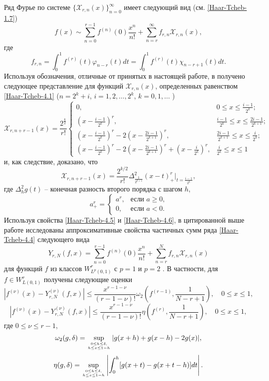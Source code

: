 Ряд Фурье по системе $\{\mathcal{X}_{r,n}(x)\}_{n=0}^\infty$ имеет следующий вид (см. \eqref{Haar-Tcheb-1.7})
  \begin{equation}\label{Haar-Tcheb-4.4}
f(x)\sim \sum_{n=0}^{r-1} f^{(n)}(0)\frac{x^n}{n!}+ \sum_{n=r}^\infty f_{r,n}\mathcal{X}_{r,n}(x),
\end{equation}
где
  $$
 f_{r,n}=\int_0^1 f^{(r)}(t)\varphi_{n-r}(t)dt=\int_0^1 f^{(r)}(t) \chi_{n-r+1}(t)dt.
$$
Используя обозначения, отличные от принятых в настоящей работе, в \cite{Haar-Tcheb-Shar19}  получено  следующее представление для функций $\mathcal{X}_{r,n}(x)$, определенных равенством \eqref{Haar-Tcheb-4.1}
 ($n=2^k+i$, $i=1,2,\ldots,2^k $, $k=0,1,\ldots$ )
  \begin{equation}\label{Haar-Tcheb-4.5}
 \mathcal{X}_{r,n+r-1}(x)=\frac{2^{\frac{k}{2}}}{r!}
 \begin{cases} 0,&\text{$0\le x\le\frac{i-1}{2^k}$;}\\
 (x-\frac{i-1}{2^k})^r,&\text{$\frac{i-1}{2^k}\le x\le \frac{2i-1}{2^{k+1}}$;}\\
 (x-\frac{i-1}{2^k})^r-2(x-\frac{2i-1}{2^{k+1}})^r,&\text{$\frac{2i-1}{2^{k+1}}\le x\le \frac{i}{2^{k}}$;}\\
  (x-\frac{i-1}{2^k})^r-2(x-\frac{2i-1}{2^{k+1}})^r+(x-\frac{i}{2^{k}})^r, &\text{$\frac{i}{2^{k}}\le x\le1$}
   \end{cases}
  \end{equation}
 и, как следствие, доказано, что
   \begin{equation}\label{Haar-Tcheb-4.6}
 \mathcal{X}_{r,n+r-1}(x)=\frac{2^{k/2}}{r!}\Delta^2_\frac{1}{2^{k+1}}(x-t)^r_+
 \big|_{t=\frac{i-1}{2^k}},
\end{equation}
где $\Delta^2_h g(t)$ -- конечная разность второго порядка с шагом $h$,
$$
a_+^r=\begin{cases}a^r,&\text{если $a\ge0$,}\\0, &\text{если $a<0$.}   \end{cases}
$$
Используя свойства \eqref{Haar-Tcheb-4.5} и \eqref{Haar-Tcheb-4.6}, в цитированной выше работе  \cite{Haar-Tcheb-Shar19} исследованы аппроксимативные свойства частичных сумм  ряда \eqref{Haar-Tcheb-4.4} следующего вида
\begin{equation}\label{Haar-Tcheb-4.7}
 Y_{r,N}(f,x)=\sum_{n=0}^{r-1} f^{(n)}(0)\frac{x^n}{n!}+ \sum_{n=r}^{N} f_{r,n}\mathcal{X}_{r,n}(x)
 \end{equation}
 для функций $f$ из  классов  $W^r_{L^p(0,1)}$ с $p=1$ и $p=2$ . В частности, для $f\in W^r_{L(0,1)}$ получены следующие оценки
  \begin{equation}\label{Haar-Tcheb-4.8}
 |f^{(\nu)}(x)-Y_{r,N}^{(\nu)}(f,x)|\le \frac{x^{r-1-\nu}}{(r-1-\nu)!}\omega_2(f^{(r-1)},\frac{1}{N-r+1}), \quad 0\le x\le1,
 \end{equation}
  \begin{equation}\label{Haar-Tcheb-4.9}
 |f^{(\nu)}(x)-Y_{r,N}^{(\nu)}(f,x)|\le \frac{x^{r-1-\nu}}{(r-1-\nu)!}\eta(f^{(r)},\frac{1}{N-r+1}), \quad 0\le x\le1,
 \end{equation}
 где $0\le \nu\le r-1$,
 $$
\omega_2(g,\delta)=\sup_{0\le h\le\delta,\atop h\le x\le 1-h}|g(x+h)+g(x-h)-2g(x)|,
$$
$$
\eta(g,\delta)=\sup_{0\le h\le\delta,\atop h\le x\le 1-h}\left|\int_0^h[g(x+t)-g(x+t-h)]dt\right|.
$$

